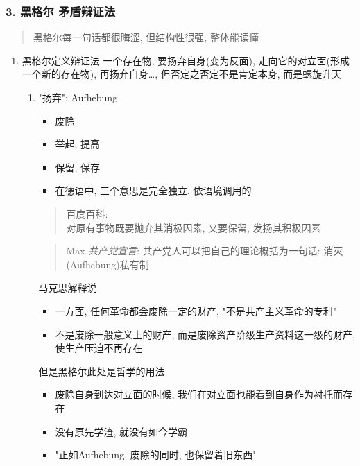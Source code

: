 \documentclass[11pt]{article}
\begin{document}
\subsubsection{3. 黑格尔 矛盾辩证法}
\label{sec:org31bd50a}
\begin{quote}
黑格尔每一句话都很晦涩, 但结构性很强, 整体能读懂
\end{quote}
\begin{enumerate}
\item 黑格尔定义辩证法
\label{sec:orgcb0980e}
一个存在物, 要扬弃自身(变为反面), 走向它的对立面(形成一个新的存在物), 
再扬弃自身\ldots{}, 但否定之否定不是肯定本身, 而是螺旋升天
\begin{enumerate}
\item "扬弃": Aufhebung
\label{sec:orgaa5518c}
\begin{itemize}
\item 废除
\item 举起, 提高
\item 保留, 保存
\item 在德语中, 三个意思是完全独立, 依语境调用的
\end{itemize}

\begin{quote}
百度百科: \\
对原有事物既要抛弃其消极因素, 又要保留, 发扬其积极因素
\end{quote}

\begin{quote}
Max-\emph{共产党宣言}: 
共产党人可以把自己的理论概括为一句话: 消灭(Aufhebung)私有制
\end{quote}

马克思解释说
\begin{itemize}
\item 一方面, 任何革命都会废除一定的财产, "不是共产主义革命的专利"
\item 不是废除一般意义上的财产, 而是废除资产阶级生产资料这一级的财产, 使生产压迫不再存在
\end{itemize}

但是黑格尔此处是哲学的用法
\begin{itemize}
\item 废除自身到达对立面的时候, 我们在对立面也能看到自身作为衬托而存在
\item 没有原先学渣, 就没有如今学霸
\item "正如Aufhebung, 废除的同时, 也保留着旧东西"
\end{itemize}
\end{enumerate}
\end{enumerate}
\end{document}
